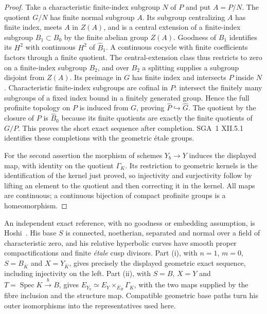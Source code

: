 \documentclass[11pt,a4paper]{article}
\begin{document}
\begin{proof}
Take a characteristic finite-index subgroup $N$ of $P$ and put $A=P/N$. The quotient $G/N$ has finite normal subgroup $A$. Its subgroup centralizing $A$ has finite index, meets $A$ in $Z(A)$, and is a central extension of a finite-index subgroup $B_1\subset B_0$ by the finite abelian group $Z(A)$. Goodness of $B_1$ identifies its $H^2$ with continuous $H^2$ of $\widehat B_1$. A continuous cocycle with finite coefficients factors through a finite quotient. The central-extension class thus restricts to zero on a finite-index subgroup $B_2$, and over $B_2$ a splitting supplies a subgroup disjoint from $Z(A)$. Its preimage in $G$ has finite index and intersects $P$ inside $N$. Characteristic finite-index subgroups are cofinal in $P$: intersect the finitely many subgroups of a fixed index bound in a finitely generated group. Hence the full profinite topology on $P$ is induced from $G$, proving $\widehat P\hookrightarrow\widehat G$. The quotient by the closure of $P$ is $\widehat B_0$ because its finite quotients are exactly the finite quotients of $G/P$. This proves the short exact sequence after completion. SGA~1 XII.5.1 identifies these completions with the geometric étale groups.

For the second assertion the morphism of schemes $Y_b\to Y$ induces the displayed map, with identity on the quotient $\Gamma_K$. Its restriction to geometric kernels is the identification of the kernel just proved, so injectivity and surjectivity follow by lifting an element to the quotient and then correcting it in the kernel. All maps are continuous; a continuous bijection of compact profinite groups is a homeomorphism.
\end{proof}

An independent exact reference, with no goodness or embedding assumption,
is Hoshi~\cite[Proposition 2.4(i),(ii), pp.~169--172]{B_Hoshi2014}.
His base $S$ is connected, noetherian, separated and normal over a field
of characteristic zero, and his relative hyperbolic curves have smooth
proper compactifications and finite \emph{\'etale} cusp divisors.
Part (i), with $n=1$, $m=0$, $S=B_{\overline K}$ and
$X=Y_{\overline K}$, gives precisely the displayed geometric exact
sequence, including injectivity on the left. Part (ii), with
$S=B$, $X=Y$ and $T=\operatorname{Spec}K\xrightarrow{b}B$, gives
$E_{Y_b}\simeq E_Y\times_{E_B}\Gamma_K$, with the two maps supplied
by the fibre inclusion and the structure map. Compatible geometric
base paths turn his outer isomorphisms into the representatives used
here.
\end{document}
